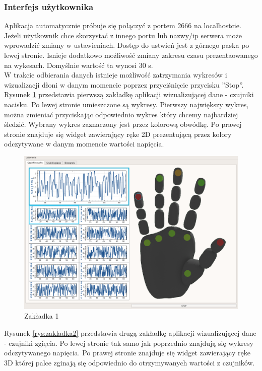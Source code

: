 \documentclass{article}
\begin{document}
\subsubsection{Interfejs użytkownika}
Aplikacja automatycznie próbuje się połączyć z portem 2666 na localhostcie. Jeżeli użytkownik chce skorzystać z innego portu lub nazwy/ip serwera może wprowadzić zmiany w ustawieniach. Dostęp do ustwień jest z górnego paska po lewej stronie. Isnieje dodatkowo możliwość zmiany zakresu czasu prezentaowanego na wykesach. Domyślnie wartość ta wynosi 30 s.\\
W trakcie odbierania danych istnieje możliwość zatrzymania wykresów i wizualizacji dłoni w danym momencie poprzez przyciśnięcie przycisku ''Stop''. \\
Rysunek \ref{rys:zakladka1} przedstawia pierwszą zakładkę aplikacji wizualizującej dane - czujniki nacisku. Po lewej stronie umieszczone są wykresy. Pierwszy największy wykres, można zmieniać przyciskając odpowiednio wykres który chcemy najbardziej śledzić. Wybrany wykres zaznaczony jest przez kolorową obwódkę. Po prawej stronie znajduje się widget zawierający ręke 2D prezentującą przez kolory odczytywane w danym momencie wartości napięcia.
\begin{figure}[H]
    \centering
    \includegraphics[width=16cm]{zakladka1.png}
    \caption{Zakładka 1}
    \label{rys:zakladka1}
\end{figure}
Rysunek \ref{rys:zakladka2} przedstawia drugą zakładkę aplikacji wizualizującej dane - czujniki zgięcia. Po lewej stronie tak samo jak poprzednio znajdują się wykresy odczytywanego napięcia. Po prawej stronie znajduje się widget zawierający ręke 3D której palce zginają się odpowiednio do otrzymywanych wartości z czujników.
\end{document}
